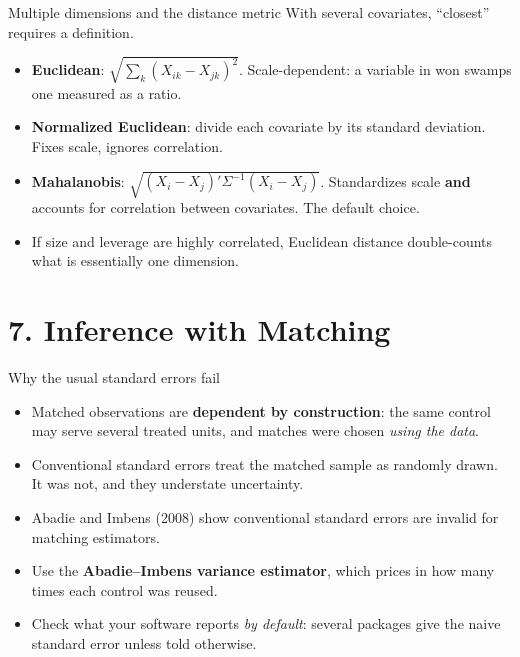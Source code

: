 \documentclass[
  11pt,
  ignorenonframetext,
  aspectratio=169,
]{beamer}
\providecommand{\tightlist}{%
  \setlength{\itemsep}{0pt}\setlength{\parskip}{0pt}}
\begin{document}
\begin{frame}{Multiple dimensions and the distance metric}
\protect{}\label{multiple-dimensions-and-the-distance-metric}
With several covariates, ``closest'' requires a definition.

\begin{itemize}
\tightlist
\item
  \textbf{Euclidean}: \(\sqrt{\sum_k (X_{ik}-X_{jk})^2}\).
  Scale-dependent: a variable in won swamps one measured as a ratio.
\item
  \textbf{Normalized Euclidean}: divide each covariate by its standard
  deviation. Fixes scale, ignores correlation.
\item
  \textbf{Mahalanobis}: \(\sqrt{(X_i - X_j)' \Sigma^{-1}(X_i-X_j)}\).
  Standardizes scale \textbf{and} accounts for correlation between
  covariates. The default choice.
\end{itemize}

\vspace{0.3em}

\begin{itemize}
\tightlist
\item
  If size and leverage are highly correlated, Euclidean distance
  double-counts what is essentially one dimension.
\end{itemize}
\end{frame}

\section{7. Inference with Matching}\label{inference-with-matching}

\begin{frame}{Why the usual standard errors fail}
\protect{}\label{why-the-usual-standard-errors-fail}
\begin{itemize}
\tightlist
\item
  Matched observations are \textbf{dependent by construction}: the same
  control may serve several treated units, and matches were chosen
  \emph{using the data}.
\item
  Conventional standard errors treat the matched sample as randomly
  drawn. It was not, and they understate uncertainty.
\item
  Abadie and Imbens (2008) show conventional standard errors are invalid
  for matching estimators.
\item
  Use the \textbf{Abadie--Imbens variance estimator}, which prices in
  how many times each control was reused.
\item
  Check what your software reports \emph{by default}: several packages
  give the naive standard error unless told otherwise.
\end{itemize}
\end{frame}
\end{document}
